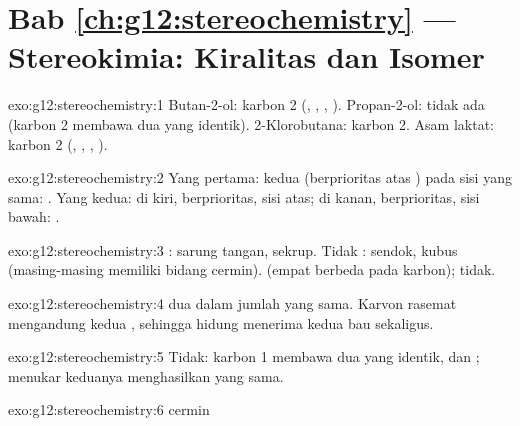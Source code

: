 \section*{Bab \ref{ch:g12:stereochemistry} --- Stereokimia: Kiralitas dan Isomer}

\begin{solution}{exo:g12:stereochemistry:1}
Butan-2-ol: karbon 2 (, , , ).
Propan-2-ol: tidak ada (karbon 2 membawa dua  yang identik).
2-Klorobutana: karbon 2. Asam laktat: karbon 2 (, ,
, ).
\end{solution}

\begin{solution}{exo:g12:stereochemistry:2}
Yang pertama: kedua  (berprioritas atas ) pada sisi yang
sama: . Yang kedua: di kiri,  berprioritas, sisi atas; di
kanan,  berprioritas, sisi bawah: .
\end{solution}

\begin{solution}{exo:g12:stereochemistry:3}
: sarung tangan, sekrup. Tidak : sendok, kubus (masing-masing
memiliki bidang cermin).   (empat  berbeda pada
karbon);  tidak.
\end{solution}

\begin{solution}{exo:g12:stereochemistry:4}
 dua  dalam jumlah yang sama. Karvon rasemat
mengandung kedua , sehingga hidung menerima kedua bau
sekaligus.
\end{solution}

\begin{solution}{exo:g12:stereochemistry:5}
Tidak: karbon 1 membawa dua  yang identik,  dan ;
menukar keduanya menghasilkan  yang sama.
\end{solution}

\begin{solution}{exo:g12:stereochemistry:6}
 \quad cermin
\quad {}
\end{solution}

